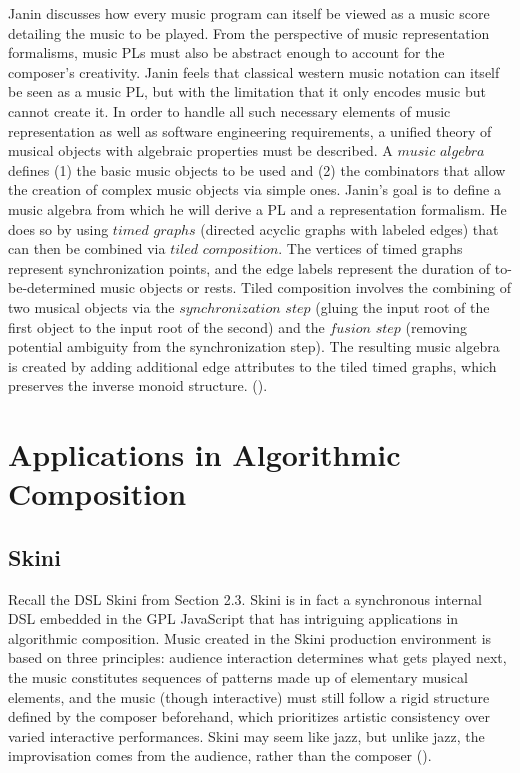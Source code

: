 \documentclass{report}
\newcommand\citeparen[1]{(\cite{#1})}
\begin{document}
Janin  discusses how  every music  program can itself be  viewed  as a music score detailing the music to be  played. From the perspective  of music representation formalisms, music PLs must also be abstract enough to account for the composer's  creativity. Janin feels that classical western music notation can itself be seen as a music PL, but with the limitation  that  it only encodes music but cannot create it. In order to  handle all such necessary elements of music representation as  well as  software engineering requirements, a unified  theory of musical objects  with algebraic properties must be described. A  $music$ $algebra$  defines  (1) the basic music  objects  to be  used and (2) the combinators that allow the  creation of complex music  objects  via simple ones. Janin's goal is to  define a  music algebra from which he will derive a PL and a representation formalism. He does so by using $timed$  $graphs$  (directed acyclic graphs with labeled edges) that can then be combined via $tiled$ $composition$. The vertices of timed  graphs represent synchronization points, and the edge labels represent the duration of to-be-determined music objects  or rests. Tiled  composition  involves the combining of two musical objects via the $synchronization$  $step$ (gluing the input  root of the first  object to the input root of the  second) and the $fusion$ $step$ (removing potential ambiguity from the synchronization step). The resulting music algebra is created by adding additional edge attributes to the tiled timed graphs,  which  preserves the inverse monoid structure.
\citeparen{janin}.

\section{Applications in Algorithmic Composition}
\label{sec:alg_comp}
\subsection{Skini}
Recall the DSL Skini from Section 2.3. Skini is in fact a synchronous internal DSL embedded in the GPL JavaScript that has intriguing applications in algorithmic composition. Music  created in the Skini production environment is based on three principles: audience  interaction determines what gets played next, the music constitutes sequences of patterns made up of elementary musical elements, and the  music (though interactive) must still follow  a  rigid structure defined by the composer beforehand, which prioritizes artistic consistency  over varied interactive performances. Skini may  seem like jazz, but  unlike jazz, the improvisation comes  from the  audience,  rather than the composer \citeparen{petit_serrano_2020}.
\end{document}
